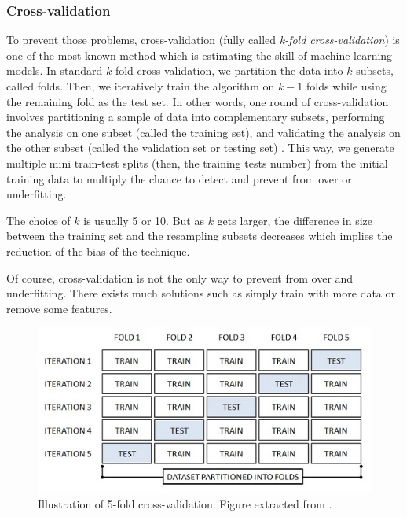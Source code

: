 \documentclass[11pt, openany]{report}
\theoremstyle{plain}
\theoremstyle{definition}
\theoremstyle{remark}
\begin{document}
\subsubsection{Cross-validation}
To prevent those problems, cross-validation (fully called \textit{k-fold cross-validation}) is one of the most known method which is estimating the skill of machine learning models. In standard $k$-fold cross-validation, we partition the data into $k$ subsets, called folds. Then, we iteratively train the algorithm on $k-1$ folds while using the remaining fold as the test set. In other words, one round of cross-validation involves partitioning a sample of data into complementary subsets, performing the analysis on one subset (called the training set), and validating the analysis on the other subset (called the validation set or testing set) \cite{wiki-cross-validation}. This way, we generate multiple mini train-test splits (then, the training tests number) from the initial training data to multiply the chance to detect and prevent from over or underfitting.

The choice of $k$ is usually 5 or 10. But as $k$ gets larger, the difference in size between the training set and the resampling subsets decreases which implies the reduction of the bias of the technique.

Of course, cross-validation is not the only way to prevent from over and underfitting. There exists much solutions such as simply train with more data or remove some features. 


\begin{figure}[h]
  \centering
  \includegraphics[scale=1.3]{figures/cross-validation.jpg}
  \caption{Illustration of 5-fold cross-validation. Figure extracted from \cite{MachineLearningForDummies}.}
  \label{fig:over-under-fit}
\end{figure}
\end{document}
